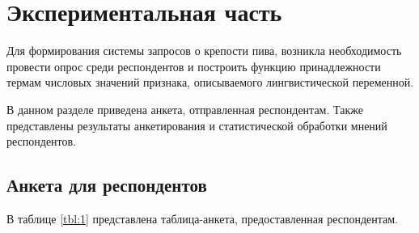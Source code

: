 \chapter{Экспериментальная часть}

Для формирования системы запросов о крепости пива, возникла необходимость провести опрос среди респондентов и построить функцию принадлежности термам числовых значений признака, описываемого лингвистической переменной.

В данном разделе приведена анкета, отправленная респондентам. Также представлены результаты анкетирования и статистической обработки мнений респондентов.

\section{Анкета для респондентов}
В таблице \ref{tbl:1} представлена таблица-анкета, предоставленная респондентам.

